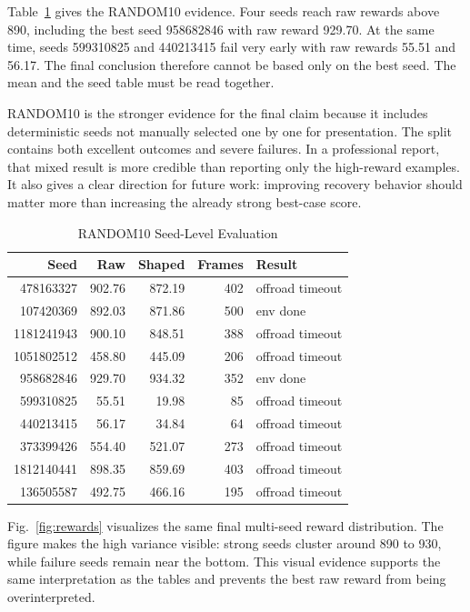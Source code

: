 \documentclass[conference]{IEEEtran}
\begin{document}
Table~\ref{tab:random10} gives the RANDOM10 evidence. Four seeds reach raw rewards above 890, including the best seed 958682846 with raw reward 929.70. At the same time, seeds 599310825 and 440213415 fail very early with raw rewards 55.51 and 56.17. The final conclusion therefore cannot be based only on the best seed. The mean and the seed table must be read together.

RANDOM10 is the stronger evidence for the final claim because it includes deterministic seeds not manually selected one by one for presentation. The split contains both excellent outcomes and severe failures. In a professional report, that mixed result is more credible than reporting only the high-reward examples. It also gives a clear direction for future work: improving recovery behavior should matter more than increasing the already strong best-case score.

\begin{table}[t]
\caption{RANDOM10 Seed-Level Evaluation}
\label{tab:random10}
\centering
\scriptsize
\begin{tabular}{rrrrl}
\toprule
Seed & Raw & Shaped & Frames & Result \\
\midrule
478163327 & 902.76 & 872.19 & 402 & offroad timeout \\
107420369 & 892.03 & 871.86 & 500 & env done \\
1181241943 & 900.10 & 848.51 & 388 & offroad timeout \\
1051802512 & 458.80 & 445.09 & 206 & offroad timeout \\
958682846 & 929.70 & 934.32 & 352 & env done \\
599310825 & 55.51 & 19.98 & 85 & offroad timeout \\
440213415 & 56.17 & 34.84 & 64 & offroad timeout \\
373399426 & 554.40 & 521.07 & 273 & offroad timeout \\
1812140441 & 898.35 & 859.69 & 403 & offroad timeout \\
136505587 & 492.75 & 466.16 & 195 & offroad timeout \\
\bottomrule
\end{tabular}
\end{table}

Fig.~\ref{fig:rewards} visualizes the same final multi-seed reward distribution. The figure makes the high variance visible: strong seeds cluster around 890 to 930, while failure seeds remain near the bottom. This visual evidence supports the same interpretation as the tables and prevents the best raw reward from being overinterpreted.
\end{document}

